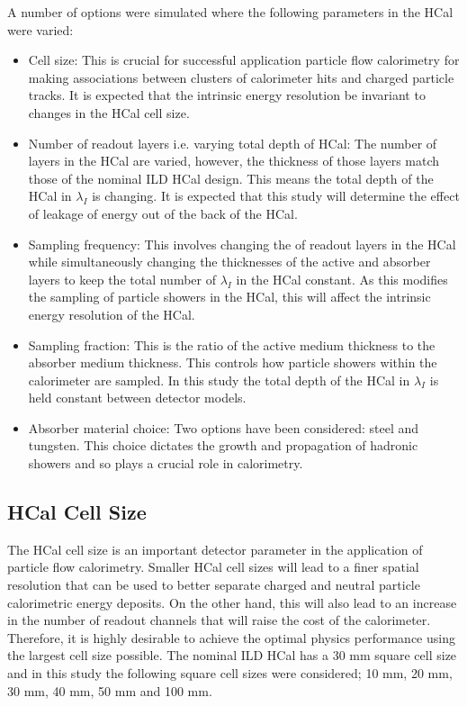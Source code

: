 A number of options were simulated where the following parameters in the HCal were varied:
\begin{itemize}
\item Cell size:  This is crucial for successful application particle flow calorimetry for making associations between clusters of calorimeter hits and charged particle tracks.  It is expected that the intrinsic energy resolution be invariant to changes in the HCal cell size.  
\item Number of readout layers i.e. varying total depth of HCal:  The number of layers in the HCal are varied, however, the thickness of those layers match those of the nominal ILD HCal design.  This means the total depth of the HCal in $\lambda_{I}$ is changing.  It is expected that this study will determine the effect of leakage of energy out of the back of the HCal.
\item Sampling frequency:   This involves changing the of readout layers in the HCal while simultaneously changing the thicknesses of the active and absorber layers to keep the total number of $\lambda_{I}$ in the HCal constant.  As this modifies the sampling of particle showers in the HCal, this will affect the intrinsic energy resolution of the HCal.
\item Sampling fraction:  This is the ratio of the active medium thickness to the absorber medium thickness.  This controls how particle showers within the calorimeter are sampled.  In this study the total depth of the HCal in $\lambda_{I}$ is held constant between detector models.  
\item Absorber material choice:  Two options have been considered: steel and tungsten.  This choice dictates the growth and propagation of hadronic showers and so plays a crucial role in calorimetry.  
\end{itemize}


\subsection{HCal Cell Size}
\label{sec:hcalcells}
The HCal cell size is an important detector parameter in the application of particle flow calorimetry.  Smaller HCal cell sizes will lead to a finer spatial resolution that can be used to better separate charged and neutral particle calorimetric energy deposits.  On the other hand, this will also lead to an increase in the number of readout channels that will raise the cost of the calorimeter.  Therefore, it is highly desirable to achieve the optimal physics performance using the largest cell size possible.  The nominal ILD HCal has a 30 mm square cell size and in this study the following square cell sizes were considered; 10 mm, 20 mm, 30 mm, 40 mm, 50 mm and 100 mm.  

